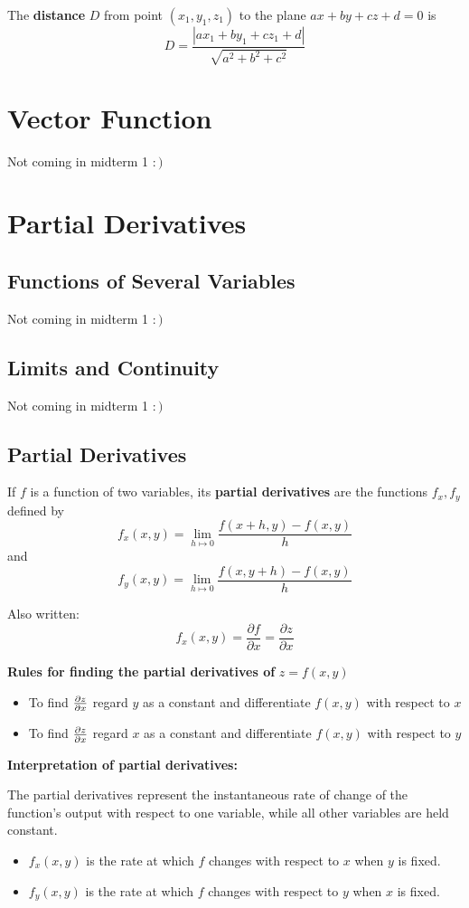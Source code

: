 \documentclass{report}
\begin{document}
The \textbf{distance} $D$ from point $(x_1, y_1, z_1)$ to the plane 
$ax + by + cz + d = 0$ is 
\[
D = \frac{|a x_1 + b y_1 + c z_1 + d|}{\sqrt{a^2 + b^2 + c^2}}
\]

\chapter{Vector Function}

Not coming in midterm 1 $:)$

\chapter{Partial Derivatives}

\section{Functions of Several Variables}
Not coming in midterm 1 $:)$

\section{Limits and Continuity}
Not coming in midterm 1 $:)$

\section{Partial Derivatives}

If $f$ is a function of two variables, its \textbf{partial derivatives} are the functions 
$f_x, f_y$ defined by \[
f_x(x, y) = \lim_{h \mapsto 0} \frac{f(x+h, y) - f(x, y)}{h}\]
and \[f_y(x, y) = \lim_{h \mapsto 0} \frac{f(x, y+h) - f(x, y)}{h}\]

Also written: 
\[
f_x(x, y) = \frac{\partial f}{\partial x} = \frac{\partial z}{\partial x}
\]

\textbf{Rules for finding the partial derivatives of } $z = f(x, y)$
\begin{itemize}
    \item To find $\frac{\partial z}{\partial x}$ regard $y$ as a constant and differentiate $f(x, y)$ with respect to $x$
    \item To find $\frac{\partial z}{\partial x}$ regard $x$ as a constant and differentiate $f(x, y)$ with respect to $y$
\end{itemize}

\textbf{Interpretation of partial derivatives:}

The partial derivatives represent the instantaneous rate of change of the function's output with respect to one variable, while all other variables are held constant.
\begin{itemize}
    \item $f_x(x,y)$ is the rate at which $f$ changes with respect to $x$ when $y$ is fixed.
    \item $f_y(x,y)$ is the rate at which $f$ changes with respect to $y$ when $x$ is fixed.
\end{itemize}
\end{document}
